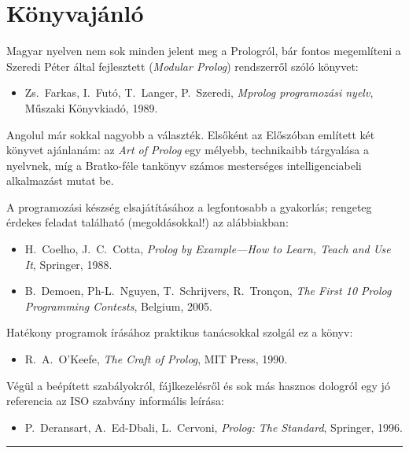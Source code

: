 \chapter{Könyvajánló}
Magyar nyelven nem sok minden jelent meg a Prologról, bár fontos
megemlíteni a Szeredi Péter által fejlesztett 
(\emph{Modular Prolog}) rendszerről szóló
könyvet:
\begin{itemize}[leftmargin=1.5cm,itemindent=-1cm,labelsep=0cm]
\item[] Zs.~Farkas, I.~Futó, T.~Langer, P.~Szeredi, \emph{Mprolog
programozási nyelv}, Műszaki Könyvkiadó, 1989.
\end{itemize}
Angolul már sokkal nagyobb a választék. Elsőként az Előszóban említett
két könyvet ajánlanám: az \emph{Art of Prolog} egy mélyebb,
technikaibb tárgyalása a nyelvnek, míg a Bratko-féle tankönyv számos
mesterséges intelligenciabeli alkalmazást mutat be.

A programozási készség elsajátításához a legfontosabb a gyakorlás;
rengeteg érdekes feladat található (megoldásokkal!) az alábbiakban:
\begin{itemize}[leftmargin=1.5cm,itemindent=-1cm,labelsep=0cm]
\item[] H.~Coelho, J.~C.~Cotta, \emph{Prolog by Example---How to Learn, Teach and Use It}, Springer, 1988.
\item[] B.~Demoen, Ph-L.~Nguyen, T.~Schrijvers, R.~Tron\c con, \emph{The First 10 Prolog Programming Contests}, Belgium, 2005.
\end{itemize}
Hatékony programok írásához praktikus tanácsokkal szolgál ez a könyv:
\begin{itemize}[leftmargin=1.5cm,itemindent=-1cm,labelsep=0cm]
\item[] R.~A.~O'Keefe, \emph{The Craft of Prolog}, MIT Press, 1990.
\end{itemize}
Végül a beépített szabályokról, fájlkezelésről és sok más hasznos
dologról egy jó referencia az ISO szabvány informális leírása:
\begin{itemize}[leftmargin=1.5cm,itemindent=-1cm,labelsep=0cm]
\item[] P.~Deransart, A.~Ed-Dbali, L.~Cervoni, \emph{Prolog: The Standard}, Springer, 1996.
\end{itemize}

\bigskip
\begin{center}
\rule{0.5\textwidth}{.5pt}
\end{center}
\bigskip

